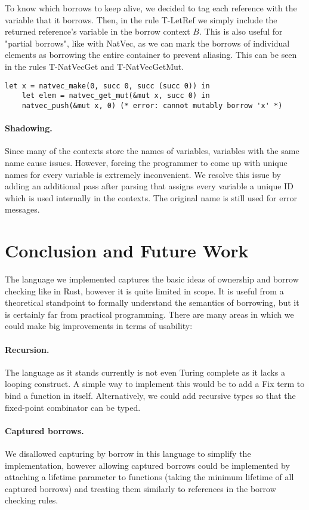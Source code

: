 \documentclass[letterpaper,11pt]{article}
\begin{document}
To know which borrows to keep alive, we decided to tag each reference with the variable that it borrows.
Then, in the rule T-LetRef we simply include the returned reference's variable in the borrow context $B$.
This is also useful for "partial borrows", like with NatVec, as we can mark the borrows of individual
elements as borrowing the entire container to prevent aliasing. This can be seen in the rules T-NatVecGet
and T-NatVecGetMut.
\begin{lstlisting}[language=caml]
    let x = natvec_make(0, succ 0, succ (succ 0)) in
    let elem = natvec_get_mut(&mut x, succ 0) in
    natvec_push(&mut x, 0) (* error: cannot mutably borrow 'x' *)
\end{lstlisting}

\paragraph{Shadowing.} Since many of the contexts store the names of variables,
variables with the same name cause issues. However, forcing the programmer to 
come up with unique names for every variable is extremely inconvenient. We resolve this issue
by adding an additional pass after parsing that assigns every variable a unique ID which is used internally
in the contexts. The original name is still used for error messages.


\section{Conclusion and Future Work}
The language we implemented captures the basic ideas of ownership and borrow checking like in Rust, however it is quite limited in scope. It is useful from a theoretical standpoint to formally understand the semantics of borrowing, but
it is certainly far from practical programming. There are many areas in which we could make big improvements in terms of usability:

\paragraph{Recursion.} The language as it stands currently is not even Turing complete as it lacks a looping construct.
A simple way to implement this would be to add a Fix term to bind a function in itself. Alternatively, we could add recursive types so that the fixed-point combinator can be typed.

\paragraph{Captured borrows.} We disallowed capturing by borrow in this language to simplify the implementation,
however allowing captured borrows could be implemented by attaching a lifetime parameter to functions (taking the minimum lifetime of all captured borrows) and treating
them similarly to references in the borrow checking rules.
\end{document}
